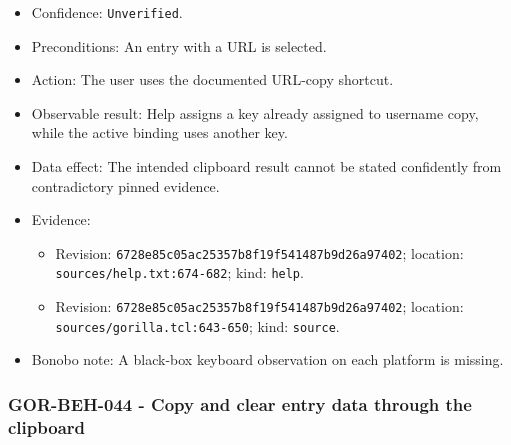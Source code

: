 \documentclass[
  letterpaper,
]{article}
\newcommand{\passthrough}[1]{#1}
\providecommand{\tightlist}{%
  \setlength{\itemsep}{0pt}\setlength{\parskip}{0pt}}
\begin{document}
\begin{itemize}
\tightlist
\item
  Confidence: \nolinkurl{Unverified}.
\item
  Preconditions: An entry with a URL is selected.
\item
  Action: The user uses the documented URL-copy shortcut.
\item
  Observable result: Help assigns a key already assigned to username copy, while the active binding uses another key.
\item
  Data effect: The intended clipboard result cannot be stated confidently from contradictory pinned evidence.
\item
  Evidence:

  \begin{itemize}
  \tightlist
  \item
    Revision: \nolinkurl{6728e85c05ac25357b8f19f541487b9d26a97402}; location: \nolinkurl{sources/help.txt:674-682};
    kind: \passthrough{\lstinline!help!}.
  \item
    Revision: \nolinkurl{6728e85c05ac25357b8f19f541487b9d26a97402}; location: \nolinkurl{sources/gorilla.tcl:643-650};
    kind: \passthrough{\lstinline!source!}.
  \end{itemize}
\item
  Bonobo note: A black-box keyboard observation on each platform is missing.
\end{itemize}

\subsubsection{GOR-BEH-044 - Copy and clear entry data through the
clipboard}\label{gor-beh-044---copy-and-clear-entry-data-through-the-clipboard}
\end{document}
